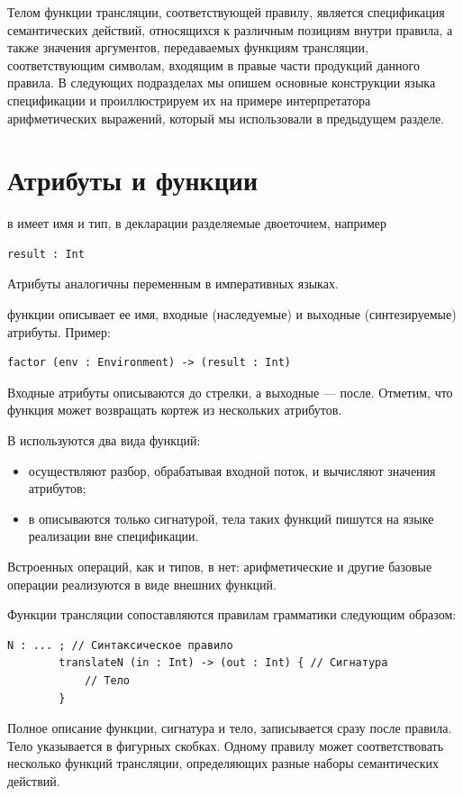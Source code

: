 Телом функции трансляции, соответствующей правилу, является спецификация семантических действий, относящихся к различным позициям внутри правила, а также значения аргументов, передаваемых функциям трансляции, соответствующим символам, входящим в правые части продукций данного правила. В следующих подразделах мы опишем основные конструкции языка спецификации \ATF{} и проиллюстрируем их на примере интерпретатора арифметических выражений, который мы использовали в предыдущем разделе.

\section{Атрибуты и функции}

 в \ATF{} имеет имя и тип, в декларации разделяемые двоеточием, например
\begin{lstlisting}
result : Int
\end{lstlisting}
Атрибуты аналогичны переменным в императивных языках.

 функции описывает ее имя, входные (наследуемые) и выходные (синтезируемые) атрибуты. Пример:
\begin{lstlisting}
factor (env : Environment) -> (result : Int)
\end{lstlisting}
Входные атрибуты описываются до стрелки, а выходные --- после. Отметим, что функция может возвращать кортеж из нескольких атрибутов.

В \ATF{} используются два вида функций:
\begin{itemize}
\item {} осуществляют разбор, обрабатывая входной поток, и вычисляют значения атрибутов;
\item {} в \ATF{} описываются только сигнатурой, тела таких функций пишутся на языке реализации вне спецификации.
\end{itemize}
Встроенных операций, как и типов, в \ATF{} нет: арифметические и другие базовые операции реализуются в виде внешних функций.

Функции трансляции сопоставляются правилам грамматики следующим образом:
\begin{lstlisting}[language=Grammatic]
	N : ... ; // Синтаксическое правило
		translateN (in : Int) -> (out : Int) { // Сигнатура
			// Тело
		}
\end{lstlisting}
Полное описание функции, сигнатура и тело, записывается сразу после правила. Тело указывается в фигурных скобках. Одному правилу может соответствовать несколько функций трансляции, определяющих разные наборы семантических действий. 

